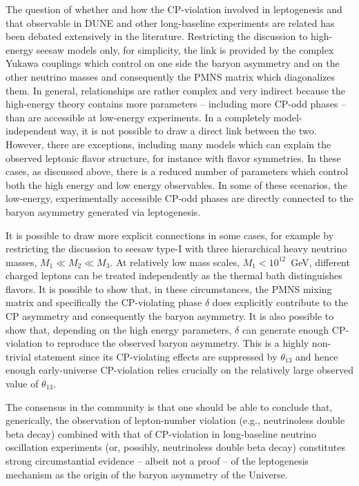 The question of whether and how the CP-violation involved in leptogenesis and that observable in DUNE and other long-baseline experiments are related has been debated extensively in the literature. Restricting the discussion to high-energy seesaw models only, for simplicity, the link is provided by the complex Yukawa couplings which control on one side the baryon asymmetry and on the other neutrino masses and consequently the PMNS matrix which diagonalizes them. In general, relationships are rather complex and very indirect because the high-energy theory contains more parameters -- including more CP-odd phases -- than are accessible at low-energy experiments. In a completely model-independent way, it is not possible to draw a direct link between the two. However, there are exceptions, including many models which can explain the observed leptonic flavor structure, for instance with  flavor symmetries. In these cases, as discussed above, there is a reduced number of parameters which control both the high energy and low energy observables. In some of these scenarios, the low-energy, experimentally accessible CP-odd phases are directly connected to the baryon asymmetry generated via leptogenesis.

It is possible to draw more explicit connections in some cases,  for example by restricting the discussion to seesaw type-I with three hierarchical heavy neutrino masses, $M_1\ll M_2\ll M_3$. 
At relatively low mass scales, $M_1< 10^{12}$~GeV, different charged leptons can be treated independently as the thermal bath distinguishes flavors. It is possible to show that, in these circumstances, the PMNS mixing matrix and specifically the CP-violating phase $\delta$ does explicitly contribute to the CP asymmetry and consequently the baryon asymmetry. It is also possible to show that, depending on the high energy parameters, $\delta$ can generate enough CP-violation to reproduce the observed baryon asymmetry. This is a highly non-trivial statement since its CP-violating effects are suppressed by $\theta_{13}$ and hence enough early-universe CP-violation relies crucially on the relatively large observed value of $\theta_{13}$. 

The consensus in the community is that one should be able to conclude that, generically, the observation of lepton-number violation (e.g., neutrinoless double beta decay) combined with that of  CP-violation in long-baseline neutrino oscillation experiments (or, possibly, neutrinoless double beta decay) constitutes strong circumstantial evidence -- albeit not a proof -- of the leptogenesis mechanism as the origin of the baryon asymmetry of the Universe.

